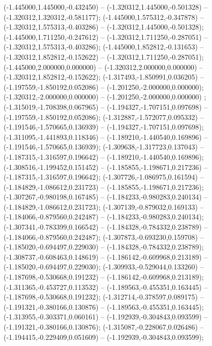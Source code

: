  (-1.445000,1.445000,-0.432450) -- (-1.320312,1.445000,-0.501328) -- (-1.320312,1.320312,-0.581177);
 (-1.445000,1.575312,-0.347878) -- (-1.320312,1.575313,-0.403286) -- (-1.320312,1.445000,-0.501328);
 (-1.445000,1.711250,-0.247612) -- (-1.320312,1.711250,-0.287051) -- (-1.320312,1.575313,-0.403286);
 (-1.445000,1.852812,-0.131653) -- (-1.320312,1.852812,-0.152622) -- (-1.320312,1.711250,-0.287051);
 (-1.445000,2.000000,0.000000) -- (-1.320312,2.000000,0.000000) -- (-1.320312,1.852812,-0.152622);
 (-1.317493,-1.850991,0.036205) -- (-1.197559,-1.850192,0.052086) -- (-1.201250,-2.000000,0.000000);
 (-1.320312,-2.000000,0.000000) -- (-1.201250,-2.000000,0.000000) ;
 (-1.315019,-1.708398,0.067965) -- (-1.194327,-1.707151,0.097698) -- (-1.197559,-1.850192,0.052086);
 (-1.312887,-1.572077,0.095332) -- (-1.191546,-1.570665,0.136939) -- (-1.194327,-1.707151,0.097698);
 (-1.311095,-1.441893,0.118346) -- (-1.189210,-1.440540,0.169896) -- (-1.191546,-1.570665,0.136939);
 (-1.309638,-1.317723,0.137043) -- (-1.187315,-1.316597,0.196642) -- (-1.189210,-1.440540,0.169896);
 (-1.308516,-1.199452,0.151452) -- (-1.185855,-1.198671,0.217236) -- (-1.187315,-1.316597,0.196642);
 (-1.307726,-1.086975,0.161594) -- (-1.184829,-1.086612,0.231723) -- (-1.185855,-1.198671,0.217236);
 (-1.307267,-0.980198,0.167485) -- (-1.184233,-0.980283,0.240134) -- (-1.184829,-1.086612,0.231723);
 (-1.307139,-0.879032,0.169133) -- (-1.184066,-0.879560,0.242487) -- (-1.184233,-0.980283,0.240134);
 (-1.307341,-0.783399,0.166542) -- (-1.184328,-0.784332,0.238789) -- (-1.184066,-0.879560,0.242487);
 (-1.307873,-0.693230,0.159708) -- (-1.185020,-0.694497,0.229030) -- (-1.184328,-0.784332,0.238789);
 (-1.308737,-0.608463,0.148619) -- (-1.186142,-0.609968,0.213189) -- (-1.185020,-0.694497,0.229030);
 (-1.309933,-0.529044,0.133260) -- (-1.187698,-0.530668,0.191232) -- (-1.186142,-0.609968,0.213189);
 (-1.311365,-0.453727,0.113532) -- (-1.189563,-0.455351,0.163445) -- (-1.187698,-0.530668,0.191232);
 (-1.312714,-0.378597,0.089175) -- (-1.191321,-0.380166,0.130876) -- (-1.189563,-0.455351,0.163445);
 (-1.313955,-0.303371,0.060161) -- (-1.192939,-0.304843,0.093599) -- (-1.191321,-0.380166,0.130876);
 (-1.315087,-0.228067,0.026486) -- (-1.194415,-0.229409,0.051609) -- (-1.192939,-0.304843,0.093599);
